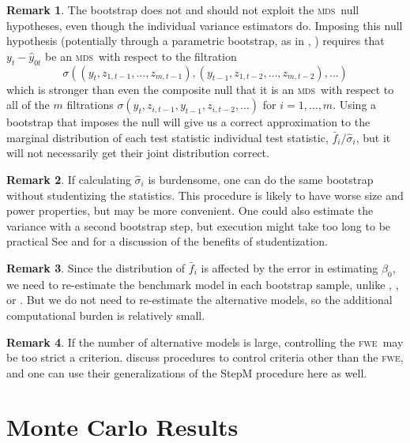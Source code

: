 \documentclass[12pt]{article}
\newcommand\citen[1]{\citeauthor{#1}, \citeyear{#1}}
\theoremstyle{definition}
\newtheorem{rem}{Remark}
\newcommand{\mds}{\textsc{mds}}
\newcommand{\fwe}{\textsc{fwe}}
\begin{document}
\begin{rem}
  The bootstrap does not and should not exploit the \mds\ null
  hypotheses, even though the individual variance estimators do.
  Imposing this null hypothesis (potentially through a parametric
  bootstrap, as in \citen{ClM:11}) requires that $y_t - \hat{y}_{0t}$
  be an \mds\ with respect to the filtration \[\sigma((y_t, z_{1,t-1},
  \dots, z_{m,t-1}), (y_{t-1}, z_{1,t-2}, \dots, z_{m,t-2}), \dots)\]
  which is stronger than even the composite null that it is an \mds\
  with respect to all of the $m$ filtrations $\sigma(y_t, z_{i,t-1},
  y_{t-1}, z_{i,t-2}, \dots)$ for $i = 1,\dots,m$.  Using a bootstrap
  that imposes the null will give us a correct approximation to the
  marginal distribution of each test statistic individual test
  statistic, $\bar{f}_i / \hat{\sigma}_i$, but it will not necessarily
  get their joint distribution correct.
\end{rem}

\begin{rem}
  If calculating $\hat{\sigma}_i$ is burdensome, one can do the same
  bootstrap without studentizing the statistics.  This procedure is
  likely to have worse size and power properties, but may be more
  convenient.  One could also estimate the variance with a second
  bootstrap step, but execution might take too long to be practical
  See \citet{Han:05} and \citet[Section~4.2]{RoW:05} for a discussion
  of the benefits of studentization.
\end{rem}

\begin{rem}
  Since the distribution of $\bar{f}_i$ is affected by the error in
  estimating $\beta_0$, we need to re-estimate the benchmark model
  in each bootstrap sample, unlike \citet{Whi:00}, \citet{Han:05}, or
  \citet{HuW:10}.  But we do not need to re-estimate the alternative
  models, so the additional computational burden is relatively small.
\end{rem}

\begin{rem}
  If the number of alternative models is large, controlling the \fwe\
  may be too strict a criterion.  \citet{RSW:08} discuss procedures to
  control criteria other than the \fwe, and one can use their
  generalizations of the StepM procedure here as well.
\end{rem}

\section{Monte Carlo Results}\label{sec:2}

\end{document}
